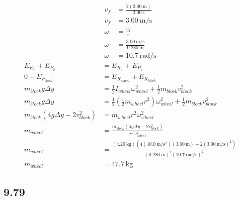 \documentclass{article}
\begin{document}
\begin{enumerate}[labelindent = 0pt, label = \textbf{Method \arabic*: }]
\begin{align*}
			v_f & = \frac{ 2(\SI{3.00}{\meter}) }{ \SI{2.00}{\second} } \\
			v_f & = \SI{3.00}{\meter \per \second} \\
			\omega & = \frac{ v_f }{ r } \\
			\omega & = \frac{ \SI{3.00}{\meter \per \second} }{ \SI{0.280}{\meter} } \\
			\omega & = \SI{10.7}{\radian \per \second}
		\end{align*}
		\begin{align*}
			E_{K_0} + E_{P_0} & = E_{K_1} + E_{P_1} \\
			0 + E_{P_{block}} & = E_{R_{wheel}} + E_{K_{block}} \\
			m_{block}g\Delta y & = \frac{1}{2}I_{wheel}\omega_{wheel}^2 + \frac{1}{2}m_{block}v_{block}^2 \\
			m_{block}g\Delta y & = \frac{1}{2}\left( \frac{1}{2}m_{wheel}r^2 \right) \omega_{wheel}^2 + \frac{1}{2}m_{block}v_{block}^2 \\
			m_{block} \left( 4g\Delta y - 2v_{block}^2 \right) & = m_{wheel}r^2\omega_{wheel}^2 \\
			m_{wheel} & = \frac{ m_{block} \left( 4g\Delta y - 2v_{block}^2 \right) }{ r^2\omega_{wheel}^2 } \\
			m_{wheel} & = \frac{ (\SI{4.20}{\kilogram}) \left( 4(\SI{10.0}{\meter \per \second \squared})(\SI{3.00}{\meter}) - 2(\SI{3.00}{\meter \per \second})^2 \right) }{ (\SI{0.280}{\meter})^2(\SI{10.7}{\radian \per \second})^2 } \\
			m_{wheel} & = \SI{47.7}{\kilogram}
		\end{align*}
\end{enumerate}

\subsection{9.79}
\end{document}
